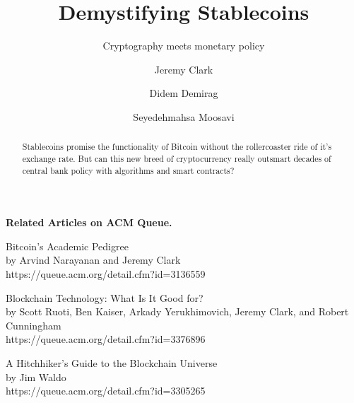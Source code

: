 \documentclass[acmlarge,screen]{acmart}
\begin{document}
\title{Demystifying Stablecoins}
\subtitle{Cryptography meets monetary policy}

\author{Jeremy Clark}

\author{Didem Demirag}

\author{Seyedehmahsa Moosavi}

\begin{abstract} Stablecoins promise the functionality of Bitcoin without the rollercoaster ride of it's exchange rate. But can this new breed of cryptocurrency really outsmart decades of central bank policy with algorithms and smart contracts?\end{abstract}

\maketitle









% 

\begin{Sidebar*}[h!]
\begin{framed}
\begin{flushleft}
\textbf{Related Articles on ACM Queue.} \newline

Bitcoin’s Academic Pedigree \\
by Arvind Narayanan and Jeremy Clark \\
https://queue.acm.org/detail.cfm?id=3136559 \newline

Blockchain Technology: What Is It Good for? \\ 
by Scott Ruoti, Ben Kaiser, Arkady Yerukhimovich, Jeremy Clark, and Robert Cunningham \\
https://queue.acm.org/detail.cfm?id=3376896 \newline

A Hitchhiker’s Guide to the Blockchain Universe\\
by Jim Waldo \\
https://queue.acm.org/detail.cfm?id=3305265
\end{flushleft}
\end{framed}
\end{Sidebar*}
\end{document}

